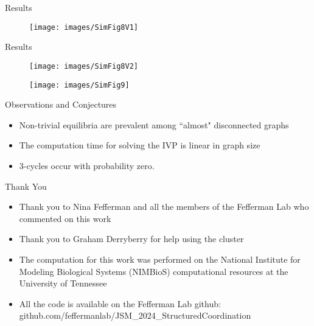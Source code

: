 \documentclass{beamer}
\begin{document}
\begin{frame}{Results}
	\begin{figure}
		\centering
		\texttt{[image: images/SimFig8V1]}
	\end{figure}
\end{frame}
\begin{frame}{Results}
	\begin{figure}
		\centering
		\texttt{[image: images/SimFig8V2]}
	\end{figure}
\end{frame}


\begin{frame}
	\begin{figure}
		\centering
		\texttt{[image: images/SimFig9]}
	\end{figure}
\end{frame}
\begin{frame}{Observations and Conjectures}
	\begin{itemize}
		\item Non-trivial equilibria are prevalent among ``almost" disconnected graphs
		\item The computation time for solving the IVP is linear in graph size
		\item $3$-cycles occur with probability zero. 
	\end{itemize}
\end{frame}

\begin{frame}{Thank You}
	\begin{itemize}
		\item Thank you to Nina Fefferman and all the members of the Fefferman Lab who commented on this work
		\item Thank you to Graham Derryberry for help using the cluster
		\item The computation for this work was performed on the National Institute for Modeling Biological Systems (NIMBioS) computational resources at the University of Tennessee
		\item All the code is available on the Fefferman Lab github: github.com/feffermanlab/JSM\_2024\_StructuredCoordination
	\end{itemize}
\end{frame}
\end{document}
